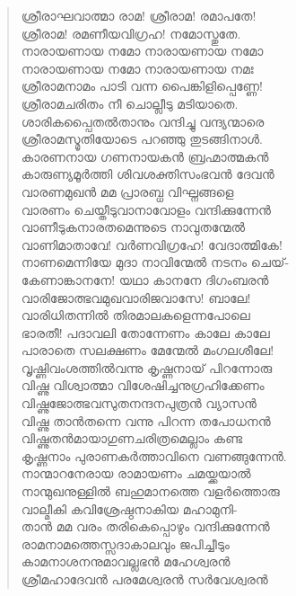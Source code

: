 \begin{verse}
ശ്രീരാഘവാത്മാ രാമ! ശ്രീരാമ! രമാപതേ!\\
ശ്രീരാമ! രമണീയവിഗ്രഹ! നമോസ്തുതേ.\\
നാരായണായ നമോ നാരായണായ നമോ\\
നാരായണായ നമോ നാരായണായ നമഃ\\
ശ്രീരാമനാമം പാടി വന്ന പൈങ്കിളിപ്പെണ്ണേ!\\
ശ്രീരാമചരിതം നീ ചൊല്ലീടു മടിയാതെ.\\
ശാരികപ്പൈത‌‌‌ല്‍താനും വന്ദിച്ചു വന്ദ്യന്മാരെ\\
ശ്രീരാമസ്മൃതിയോടെ പറഞ്ഞു തുടങ്ങിനാള്‍.\\
കാരണനായ ഗണനായക‍ന്‍ ബ്രഹ്മാത്മകന്‍\\
കാരുണ്യമൂര്‍ത്തി ശിവശക്തിസംഭവന്‍ ദേവന്‍\\
വാരണമുഖന്‍ മമ പ്രാരബ്ധ വിഘ്നങ്ങളെ\\
വാരണം ചെയ്തീടുവാനാവോളം വന്ദിക്കുന്നേന്‍\\
വാണീടുകനാരതമെന്നുടെ നാവുതന്മേല്‍\\
വാണിമാതാവേ! വര്‍ണവിഗ്രഹേ! വേദാത്മികേ!\\
നാണമെന്നിയേ മുദാ നാവിന്മേല്‍ നടനം ചെയ്-\\
കേണാങ്കാനനേ! യഥാ കാനനേ ദിഗംബരന്‍\\
വാരിജോത്ഭവമുഖവാരിജവാസേ! ബാലേ!\\
വാരിധിതന്നില്‍ തിരമാലകളെന്നപോലെ\\
ഭാരതീ! പദാവലി തോന്നേണം കാലേ കാലേ\\
പാരാതെ സലക്ഷണം മേന്മേല്‍ മംഗലശീലേ!\\
വൃഷ്ണിവംശത്തില്‍വന്നു കൃഷ്ണനായ് പിറന്നോരു\\
വിഷ്ണു വിശ്വാത്മാ വിശേഷിച്ചനുഗ്രഹിക്കേണം\\
വിഷ്ണുജോത്ഭവസുതനന്ദനപുത്രന്‍ വ്യാസന്‍\\
വിഷ്ണു താന്‍തന്നെ വന്നു പിറന്ന തപോധനന്‍\\
വിഷ്ണുതന്‍മായാഗുണചരിത്രമെല്ലാം കണ്ട\\
കൃഷ്ണനാം പുരാണകര്‍ത്താവിനെ വണങ്ങുന്നേന്‍.\\
നാന്മാറനേരായ രാമായണം ചമയ്ക്കയാല്‍\\
നാന്മുഖനുള്ളില്‍ ബഹുമാനത്തെ വളര്‍ത്തൊരു\\
വാല്മീകി കവിശ്രേഷ്ഠനാകിയ മഹാമുനി-\\
താന്‍ മമ വരം തരികെപ്പൊഴും വന്ദിക്കുന്നേന്‍\\
രാമനാമത്തെസ്സദാകാലവും ജപിച്ചീടും\\
കാമനാശനനുമാവല്ലഭന്‍ മഹേശ്വരന്‍\\
ശ്രീമഹാദേവന്‍ പരമേശ്വരന്‍ സര്‍വേശ്വരന്‍\\

\end{verse}
